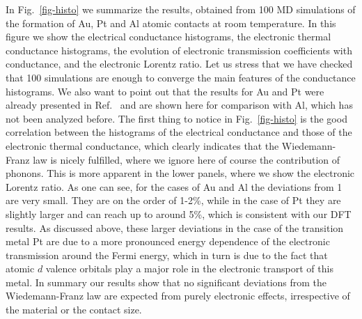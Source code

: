\documentclass[aps,amsmath,amssymb,twocolumn,showpacs]{revtex4-1}
\begin{document}
In Fig.~\ref{fig-histo} we summarize the results, obtained from 100 MD
simulations of the formation of Au, Pt and Al atomic contacts at room
temperature. In this figure we show the electrical conductance histograms, the
electronic thermal conductance histograms, the evolution of electronic
transmission coefficients with conductance, and the electronic Lorentz
ratio. Let us stress that we have checked that 100 simulations are enough to
converge the main features of the conductance histograms. We also want to
point out that the results for Au and Pt were already presented in
Ref.~ and are shown here for comparison with Al, which has
not been analyzed before. The first thing to notice in Fig.~\ref{fig-histo} is
the good correlation between the histograms of the electrical conductance and
those of the electronic thermal conductance, which clearly indicates that the
Wiedemann-Franz law is nicely fulfilled, where we ignore here of course the
contribution of phonons. This is more apparent in the lower panels, where we
show the electronic Lorentz ratio. As one can see, for the cases of Au and Al
the deviations from 1 are very small. They are on the order of 1-2\%, while in
the case of Pt they are slightly larger and can reach up to around 5\%, which
is consistent with our DFT results. As discussed above, these larger deviations 
in the case of the transition metal Pt are due to a more pronounced energy dependence 
of the electronic transmission around the Fermi energy, which in turn is due to 
the fact that atomic $d$ valence orbitals play a major role in the electronic
transport of this metal. In summary our results show that no significant
deviations from the Wiedemann-Franz law are expected from purely electronic
effects, irrespective of the material or the contact size.
\end{document}
